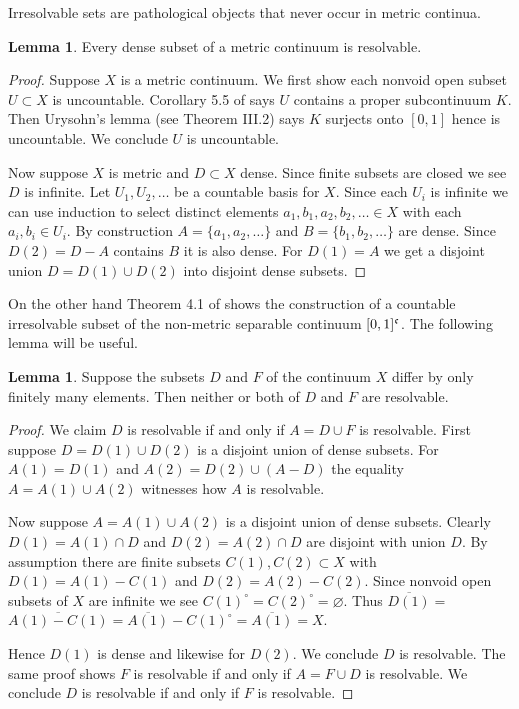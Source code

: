 \documentclass[12pt]{article}
\theoremstyle{plain}
\theoremstyle{definition}
\newtheorem{lemma}[theorem]{Lemma}
\newcounter{claim5counter}
\newcommand{\0}{\ensuremath{\varnothing}}
\newcommand{\cn}{\ensuremath{\frak c}}
\begin{document}
	Irresolvable sets are pathological objects that never occur in metric continua.
	
	\begin{lemma} \label{resolvable}
		Every dense subset of a metric continuum is resolvable.
	\end{lemma}
	
	\begin{proof}
		Suppose $X$ is a metric continuum. We first show each nonvoid open subset $U \subset X$ is uncountable.
		Corollary 5.5 of \cite{nadlerbook} says $U$ contains a proper subcontinuum $K$.
		Then Urysohn's lemma (see \cite{NagataTopology} Theorem III.2) says $K$ surjects onto $[0,1]$ hence is uncountable.
		We conclude $U$ is uncountable.
		
		Now suppose $X$ is metric and $D \subset X$ dense. Since finite subsets are closed we see $D$ is infinite. Let $U_1,U_2,\ldots$ be a countable basis for $X$. Since each $U_i$ is infinite we can use induction to select distinct elements $a_1,b_1,a_2,b_2, \ldots \in X$ with each $a_i,b_i \in U_i$. By construction $A = \{a_1,a_2,\ldots\}$ and $B = \{b_1,b_2,\ldots\}$ are dense. Since $D(2) = D - A$ contains $B$ it is also dense. For $D(1) = A$ we get a disjoint union $D=D(1) \cup D(2)$ into disjoint dense subsets.
	\end{proof}
	
	On the other hand Theorem 4.1 of \cite{Submaximal} shows the construction 
	of a countable irresolvable subset of the non-metric separable continuum $[0,1]^\cn$.
	The following lemma will be useful.
	
	
	\begin{lemma} \label{irresolvabledifference}
		Suppose the subsets $D$ and $F$ of the continuum $X$ differ by only finitely many elements.
		Then neither or both of $D$ and $F$ are resolvable.
	\end{lemma}
	
	\begin{proof}
		We claim $D$ is resolvable if and only if $A = D \cup F$ is resolvable.
		First suppose $D = D(1) \cup D(2)$ is a disjoint union of dense subsets.
		For $A(1) = D(1)$ and $A(2) = D(2) \cup (A-D)$ the equality $A = A(1) \cup A(2)$ witnesses how $A$ is resolvable. 
		
		Now suppose $A = A(1) \cup A(2)$ is a disjoint union of dense subsets.
		Clearly $D(1) = A(1) \cap D$ and $D(2) = A(2) \cap D$ are disjoint with union $D$.
		By assumption there are finite subsets $C(1),C(2) \subset X$ with
		$D(1) = A(1) - C(1)$ and $D(2) = A(2) - C(2)$.
		Since nonvoid open subsets of $X$ are infinite we see $C(1)^\circ = C(2)^\circ = \0$.
		Thus $\overline {D(1)} = $ $\overline {A(1) - C(1)} = \overline {A(1)} - C(1)^\circ = \overline {A(1)} = X$.
		
		Hence $D(1)$ is dense and likewise for $D(2)$.
		We conclude $D$ is resolvable.
		The same proof shows $F$ is resolvable if and only if $A = F \cup D$ is resolvable.
		We conclude $D$ is resolvable if and only if $F$ is resolvable. 
	\end{proof}
	
\end{document}
